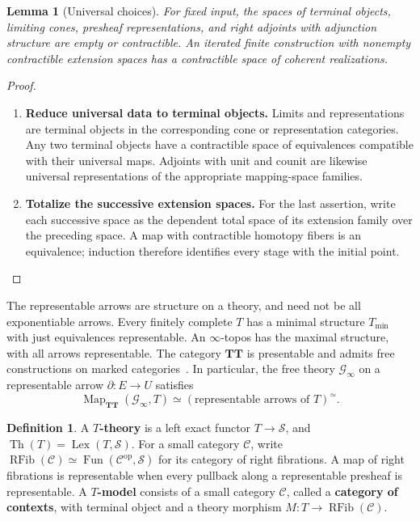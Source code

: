 \documentclass[oneside]{article}
\theoremstyle{plain}
\newtheorem{lemma}[theorem]{Lemma}
\theoremstyle{definition}
\newtheorem{definition}[theorem]{Definition}
\theoremstyle{remark}
\newcommand{\Fun}{\operatorname{Fun}}
\newcommand{\GInfty}{\mathcal G_{\infty}}
\newcommand{\Lex}{\operatorname{Lex}}
\newcommand{\Map}{\operatorname{Map}}
\newcommand{\RFib}[1]{\operatorname{RFib}(#1)}
\newcommand{\Sps}{\mathcal S}
\newcommand{\TT}{\mathbf{TT}}
\newcommand{\Th}{\operatorname{Th}}
\newcommand{\core}{\simeq}
\newcommand{\minrep}{\mathrm{min}}
\newcommand{\op}{\mathrm{op}}
\begin{document}
\begin{lemma}[Universal choices]
\label{lem:universal-choices}
    For fixed input, the spaces of terminal objects, limiting cones, presheaf representations, and right adjoints with adjunction structure are empty or contractible. An iterated finite construction with nonempty contractible extension spaces has a contractible space of coherent realizations.
\end{lemma}
\begin{proof}
    \leavevmode
    \begin{enumerate}
        \item \textbf{Reduce universal data to terminal objects.} Limits and representations are terminal objects in the corresponding cone or representation categories. Any two terminal objects have a contractible space of equivalences compatible with their universal maps. Adjoints with unit and counit are likewise universal representations of the appropriate mapping-space families.
    
        \item \textbf{Totalize the successive extension spaces.} For the last assertion, write each successive space as the dependent total space of its extension family over the preceding space. A map with contractible homotopy fibers is an equivalence; induction therefore identifies every stage with the initial point.\qedhere
    \end{enumerate}
\end{proof}

The representable arrows are structure on a theory, and need not be all exponentiable arrows. Every finitely complete $T$ has a minimal structure $T_{\minrep}$ with just equivalences representable. An $\infty$-topos has the maximal structure, with all arrows representable. The category $\TT$ is presentable and admits free constructions on marked categories~\cite[\S3.1]{NguyenUemura2025}. In particular, the free theory $\GInfty$ on a representable arrow $\partial:E\to U$ satisfies
\[
    \Map_{\TT}(\GInfty,T)\simeq(\text{representable arrows of }T)^\core.
\]

\begin{definition}
\label{def:theory-model}
    A \textbf{$T$-theory} is a left exact functor $T\to\Sps$, and $\Th(T)=\Lex(T,\Sps).$ For a small category $\mathcal C$, write $\RFib{\mathcal C}\simeq\Fun(\mathcal C^{\op},\Sps)$ for its category of right fibrations. A map of right fibrations is representable when every pullback along a representable presheaf is representable. A \textbf{$T$-model} consists of a small category $\mathcal C$, called a \textbf{category of contexts}, with terminal object and a theory morphism $M:T\to\RFib{\mathcal C}$.
\end{definition}
\end{document}
